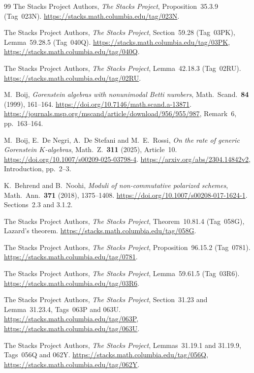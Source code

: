 \begin{thebibliography}{99}
The Stacks Project Authors,
\emph{The Stacks Project}, Proposition~35.3.9 (Tag~023N).
\url{https://stacks.math.columbia.edu/tag/023N}.

The Stacks Project Authors,
\emph{The Stacks Project}, Section~59.28 (Tag~03PK),
Lemma~59.28.5 (Tag~040Q).
\url{https://stacks.math.columbia.edu/tag/03PK},
\url{https://stacks.math.columbia.edu/tag/040Q}.

The Stacks Project Authors,
\emph{The Stacks Project}, Lemma~42.18.3 (Tag~02RU).
\url{https://stacks.math.columbia.edu/tag/02RU}.


M.~Boij, \emph{Gorenstein algebras with nonunimodal Betti numbers},
Math.~Scand.~\textbf{84} (1999), 161--164.
\url{https://doi.org/10.7146/math.scand.a-13871}.
\url{https://journals.msp.org/mscand/article/download/956/955/987},
Remark~6, pp.~163--164.

M.~Boij, E.~De Negri, A.~De Stefani and M.~E.~Rossi,
\emph{On the rate of generic Gorenstein $K$-algebras},
Math.~Z.~\textbf{311} (2025), Article~10.
\url{https://doi.org/10.1007/s00209-025-03798-4}.
\url{https://arxiv.org/abs/2304.14842v2}, Introduction, pp.~2--3.

K.~Behrend and B.~Noohi,
\emph{Moduli of non-commutative polarized schemes},
Math.~Ann.~\textbf{371} (2018), 1375--1408.
\url{https://doi.org/10.1007/s00208-017-1624-1}.
Sections~2.3 and 3.1.2.

The Stacks Project Authors,
\emph{The Stacks Project}, Theorem~10.81.4 (Tag~058G), Lazard's theorem.
\url{https://stacks.math.columbia.edu/tag/058G}.

The Stacks Project Authors,
\emph{The Stacks Project}, Proposition~96.15.2 (Tag~0781).
\url{https://stacks.math.columbia.edu/tag/0781}.

The Stacks Project Authors,
\emph{The Stacks Project}, Lemma~59.61.5 (Tag~03R6).
\url{https://stacks.math.columbia.edu/tag/03R6}.

The Stacks Project Authors,
\emph{The Stacks Project}, Section~31.23 and Lemma~31.23.4,
Tags~063P and 063U.
\url{https://stacks.math.columbia.edu/tag/063P},
\url{https://stacks.math.columbia.edu/tag/063U}.

The Stacks Project Authors,
\emph{The Stacks Project}, Lemmas~31.19.1 and 31.19.9,
Tags~056Q and 062Y.
\url{https://stacks.math.columbia.edu/tag/056Q},
\url{https://stacks.math.columbia.edu/tag/062Y}.



\end{thebibliography}
